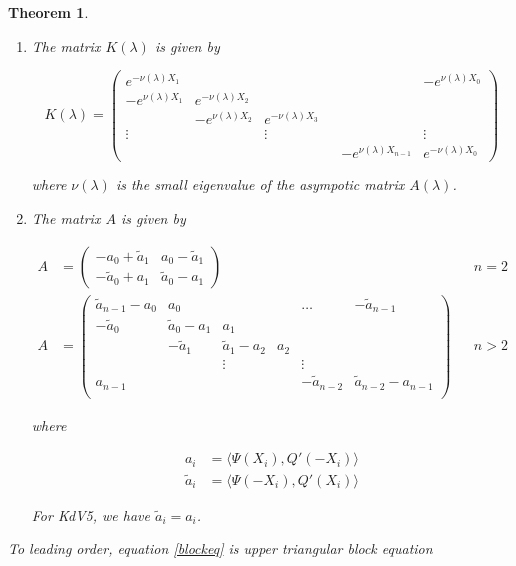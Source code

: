 \documentclass[12pt]{article}
\newtheorem{theorem}{Theorem}
\begin{document}
\begin{theorem}
\begin{enumerate}
\item The matrix $K(\lambda)$ is given by

\begin{equation}
K(\lambda) = 
\begin{pmatrix}
e^{-\nu(\lambda)X_1} & & & & & -e^{\nu(\lambda)X_0} \\
-e^{\nu(\lambda)X_1} & e^{-\nu(\lambda)X_2} \\
& -e^{\nu(\lambda)X_2} & e^{-\nu(\lambda)X_3} \\
\vdots & & \vdots & &&  \vdots \\
& & & & -e^{\nu(\lambda)X_{n-1}} & e^{-\nu(\lambda)X_0} 
\end{pmatrix}
\end{equation}

where $\nu(\lambda)$ is the small eigenvalue of the asympotic matrix $A(\lambda)$.

\item The matrix $A$ is given by

\begin{align*}
A &= \begin{pmatrix}
-a_0 + \tilde{a}_1 & a_0 - \tilde{a}_1 \\
-\tilde{a}_0 + a_1 & \tilde{a}_0 - a_1
\end{pmatrix} && n = 2 \\
A &= \begin{pmatrix}
\tilde{a}_{n-1} - a_0 & a_0 & & & \dots & -\tilde{a}_{n-1}\\
-\tilde{a}_0 & \tilde{a}_0 - a_1 &  a_1 \\
& -\tilde{a}_1 & \tilde{a}_1 - a_2 &  a_2 \\
& & \vdots & & \vdots \\
a_{n-1} & & & & -\tilde{a}_{n-2} & \tilde{a}_{n-2} - a_{n-1} \\
\end{pmatrix} && n > 2
\end{align*}

where

\begin{align*}
a_i &= \langle \Psi(X_i), Q'(-X_i) \rangle \\
\tilde{a}_i &= \langle \Psi(-X_i), Q'(X_i) \rangle
\end{align*}

For KdV5, we have $\tilde{a}_i = a_i$.

\end{enumerate}

To leading order, equation \eqref{blockeq} is upper triangular block equation


\end{theorem}
\end{document}
